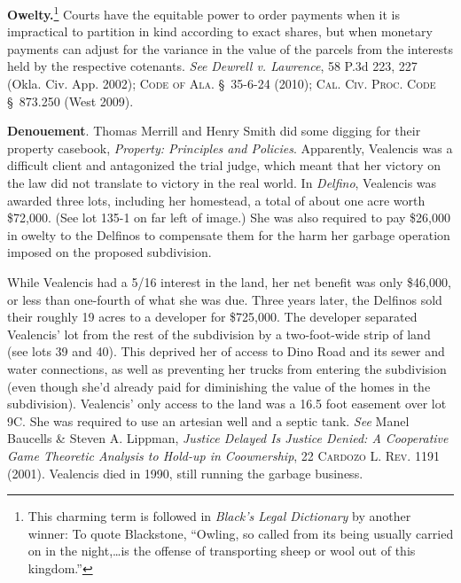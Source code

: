 
\item \textbf{Owelty.}\footnote{This charming term is followed in
\textit{Black's Legal Dictionary} by another winner: To quote Blackstone,
``Owling, so called from its being usually carried on in the night,\dots is
the offense of transporting sheep or wool out of this kingdom.''} Courts have
the equitable power to order  payments when it is impractical to
partition in kind according to exact shares, but when monetary payments can
adjust for the variance in the value of the parcels from the interests held by
the respective cotenants. \textit{See} \emph{Dewrell v. Lawrence}, 58 P.3d 223,
227
(Okla. Civ. App. 2002); \textsc{Code of Ala.} \S~35-6-24 (2010); \textsc{Cal.
Civ. Proc. Code} \S~873.250 (West 2009).


\item \textbf{Denouement}. Thomas Merrill and Henry Smith did some digging for
their property casebook, \textit{Property: Principles and Policies}.
Apparently, Vealencis was a difficult client and antagonized the trial judge,
which meant that her victory on the law did not translate to victory in the
real world. In \textit{Delfino}, Vealencis was awarded three lots, including
her homestead, a total of about one acre worth \$72,000. (See lot 135-1 on far
left of image.) She was also required to pay \$26,000 in owelty to the
Delfinos to compensate them for the harm her garbage operation imposed on the
proposed subdivision.


While Vealencis had a 5/16 interest in the land, her net benefit was only
\$46,000, or less than one-fourth of what she was due. Three years later, the
Delfinos sold their roughly 19 acres to a developer for \$725,000. The
developer separated Vealencis' lot from the rest of the subdivision by a
two-foot-wide strip of land (see lots 39 and 40). This deprived her of access
to Dino Road and its sewer and water connections, as well as preventing her
trucks from entering the subdivision (even though she'd already paid for
diminishing the value of the homes in the subdivision). Vealencis' only access
to the land was a 16.5 foot easement over lot 9C. She was required to use an
artesian well and a septic tank. \textit{See} Manel Baucells \& Steven A.
Lippman, \textit{Justice Delayed Is Justice Denied: A Cooperative Game
Theoretic Analysis to Hold-up in Coownership}, 22 \textsc{Cardozo L. Rev.} 1191
(2001). Vealencis died in 1990, still running the garbage business.



